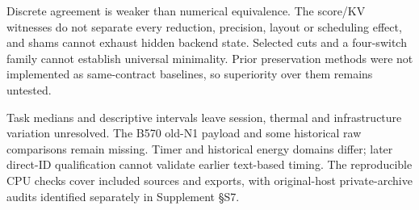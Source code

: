 Discrete agreement is weaker than numerical equivalence. The score/KV witnesses do not separate every reduction, precision, layout or scheduling effect, and shams cannot exhaust hidden backend state. Selected cuts and a four-switch family cannot establish universal minimality. Prior preservation methods were not implemented as same-contract baselines, so superiority over them remains untested.

Task medians and descriptive intervals leave session, thermal and infrastructure variation unresolved. The B570 old-N1 payload and some historical raw comparisons remain missing. Timer and historical energy domains differ; later direct-ID qualification cannot validate earlier text-based timing. The reproducible CPU checks cover included sources and exports, with original-host private-archive audits identified separately in Supplement \S S7.

